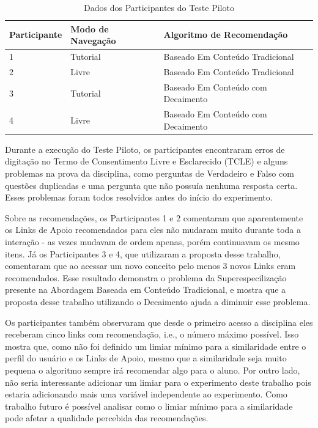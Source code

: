 \begin{table}[h]
\footnotesize
\caption[Dados dos Participantes do Teste Piloto]{Dados dos Participantes do Teste Piloto}
\label{tab:participantes-teste-piloto}
\centering
\begin{tabular}{|p{2cm}|p{3.5cm}|p{6.5cm}|}
  \hline
  \textbf{Participante} & \textbf{Modo de Navegação} & \textbf{Algoritmo de Recomendação} \\
  \hline
  1 & Tutorial & Baseado Em Conteúdo Tradicional \\
  \hline
  2 & Livre & Baseado Em Conteúdo Tradicional \\
  \hline
  3 & Tutorial & Baseado Em Conteúdo com Decaimento \\
  \hline
  4 & Livre & Baseado Em Conteúdo com Decaimento \\
  \hline
\end{tabular}
\end{table}

Durante a execução do Teste Piloto, os participantes encontraram erros de digitação no Termo de Consentimento Livre e Esclarecido (TCLE)
e alguns problemas na prova da disciplina, como perguntas de Verdadeiro e Falso com questões duplicadas e uma
pergunta que não possuía nenhuma resposta certa. Esses problemas foram todos resolvidos antes do início do experimento.

Sobre as recomendações, os Participantes 1 e 2 comentaram que aparentemente os Links de Apoio recomendados para eles não
mudaram muito durante toda a interação - as vezes mudavam de ordem apenas, porém continuavam os mesmo itens. Já os Participantes
3 e 4, que utilizaram a proposta desse trabalho, comentaram que ao acessar um novo conceito pelo menos 3 novos Links eram
recomendados. Esse resultado demonstra o problema da Superespecilização presente na Abordagem Baseada em Conteúdo Tradicional,
e mostra que a proposta desse trabalho utilizando o Decaimento ajuda a diminuir esse problema.

Os participantes também observaram que desde o primeiro acesso a disciplina eles receberam cinco links com recomendação, i.e.,
o número máximo possível. Isso mostra que, como não foi definido um limiar mínimo para a similaridade entre o perfil do usuário
e os Links de Apoio, mesmo que a similaridade seja muito pequena o algoritmo sempre irá recomendar algo para o aluno. Por
outro lado, não seria interessante adicionar um limiar para o experimento deste trabalho pois estaria adicionando
mais uma variável independente ao experimento. Como trabalho futuro é possível analisar como o limiar mínimo para a
similaridade pode afetar a qualidade percebida das recomendações.

